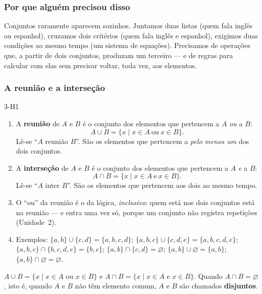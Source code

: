 \DeOndeVem

\subsubsection{Por que alguém precisou disso}
Conjuntos raramente aparecem sozinhos. Juntamos duas listas (quem fala inglês ou espanhol), cruzamos dois critérios (quem fala inglês e espanhol), exigimos duas condições ao mesmo tempo (um sistema de equações). Precisamos de operações que, a partir de dois conjuntos, produzam um terceiro — e de regras para calcular com elas sem precisar voltar, toda vez, aos elementos.

\subsubsection{A reunião e a interseção}
\begin{construcao}{3-H1}
\begin{enumerate}[label=(\arabic*)]
  \item A \textbf{reunião} de $A$ e $B$ é o conjunto dos elementos que pertencem a $A$ \emph{ou} a $B$:
\[
A\cup B=\{x\mid x\in A\ \text{ou}\ x\in B\}.
\]
Lê-se \enquote{$A$ reunião $B$}. São os elementos que pertencem a \emph{pelo menos um} dos dois conjuntos.
  \item A \textbf{interseção} de $A$ e $B$ é o conjunto dos elementos que pertencem a $A$ \emph{e} a $B$:
\[
A\cap B=\{x\mid x\in A\ \text{e}\ x\in B\}.
\]
Lê-se \enquote{$A$ inter $B$}. São os elementos que pertencem aos dois ao mesmo tempo.
  \item O \enquote{ou} da reunião é o da lógica, \emph{inclusivo}: quem está nos dois conjuntos está na reunião — e entra uma vez só, porque um conjunto não registra repetições (Unidade~2).
  \item Exemplos: $\{a,b\}\cup\{c,d\}=\{a,b,c,d\}$; $\{a,b,c\}\cup\{c,d,e\}=\{a,b,c,d,e\}$; $\{a,b,c\}\cap\{b,c,d,e\}=\{b,c\}$; $\{a,b\}\cap\{c,d\}=\varnothing$; $\{a,b\}\cup\varnothing=\{a,b\}$; $\{a,b\}\cap\varnothing=\varnothing$.
\end{enumerate}
\end{construcao}

\begin{definicao}
$A\cup B=\{x\mid x\in A\text{ ou }x\in B\}$ e $A\cap B=\{x\mid x\in A\text{ e }x\in B\}$. Quando $A\cap B=\varnothing$, isto é, quando $A$ e $B$ não têm elemento comum, $A$ e $B$ são chamados \textbf{disjuntos}.
\end{definicao}

